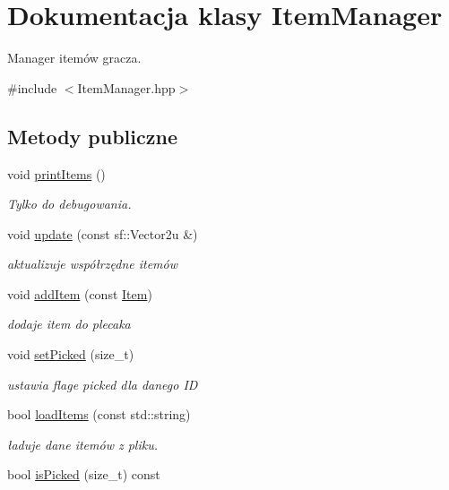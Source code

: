 \hypertarget{class_item_manager}{\section{Dokumentacja klasy Item\-Manager}
\label{class_item_manager}
}


Manager itemów gracza.  




{\ttfamily \#include $<$Item\-Manager.\-hpp$>$}

\subsection*{Metody publiczne}
\begin{DoxyCompactItemize}
\item 
\hypertarget{class_item_manager_a67fde2ac12d912e419ad0d92b4b12398}{void \hyperlink{class_item_manager_a67fde2ac12d912e419ad0d92b4b12398}{print\-Items} ()}\label{class_item_manager_a67fde2ac12d912e419ad0d92b4b12398}

\begin{DoxyCompactList}\small\item\em Tylko do debugowania. \end{DoxyCompactList}\item 
void \hyperlink{class_item_manager_ad62ffaa692d727adf551a0b6235b66b8}{update} (const sf\-::\-Vector2u \&)
\begin{DoxyCompactList}\small\item\em aktualizuje współrzędne itemów \end{DoxyCompactList}\item 
void \hyperlink{class_item_manager_a128c9c267f271881a68bbe49cfbfa2d8}{add\-Item} (const \hyperlink{struct_item}{Item})
\begin{DoxyCompactList}\small\item\em dodaje item do plecaka \end{DoxyCompactList}\item 
void \hyperlink{class_item_manager_a14f1f8717804441005683f3dc37fd10e}{set\-Picked} (size\-\_\-t)
\begin{DoxyCompactList}\small\item\em ustawia flage picked dla danego I\-D \end{DoxyCompactList}\item 
bool \hyperlink{class_item_manager_a57d93634c5347ef69e4cb7888564e852}{load\-Items} (const std\-::string)
\begin{DoxyCompactList}\small\item\em ładuje dane itemów z pliku. \end{DoxyCompactList}\item 
\hypertarget{class_item_manager_abda651aea3b37cb983e158b2b743a4ca}{bool \hyperlink{class_item_manager_abda651aea3b37cb983e158b2b743a4ca}{is\-Picked} (size\-\_\-t) const }\label{class_item_manager_abda651aea3b37cb983e158b2b743a4ca}


\end{DoxyCompactItemize}
